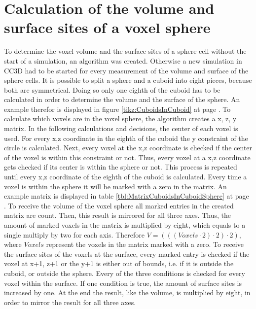 \section{Calculation of the volume and surface sites of a voxel sphere}\label{sec:CreatedAlgorithm}
To determine the voxel volume and the surface sites of a sphere cell without the start of a simulation, an algorithm was created. Otherwise a new simulation in \ac{CC3D} had to be started for every measurement of the volume and surface of the sphere cells. \newline
It is possible to split a sphere and a cuboid into eight pieces, because both are symmetrical. Doing so only one eighth of the cuboid has to be calculated in order to determine the volume and the surface of the sphere. An example therefor is displayed in figure \ref{tikz:CuboidsInCuboid} at page \pageref{tikz:CuboidsInCuboid}. \newline
To calculate which voxels are in the voxel sphere, the algorithm creates a x, z, y matrix. In the following calculations and decisions, the center of each voxel is used. For every x,z coordinate in the eighth of the cuboid the y constraint of the circle is calculated. Next, every voxel at the x,z coordinate is checked if the center of the voxel is within this constraint or not. Thus, every voxel at a x,z coordinate gets checked if its center is within the sphere or not. This process is repeated until every x,z coordinate of the eighth of the cuboid is calculated. Every time a voxel is within the sphere it will be marked with a zero in the matrix. An example matrix is displayed in table \ref{tbl:MatrixCuboidsInCuboidSphere} at page \pageref{tbl:MatrixCuboidsInCuboidSphere}. \newline
To receive the volume of the voxel sphere all marked entries in the created matrix are count. Then, this result is mirrored for all three axes. Thus, the amount of marked voxels in the matrix is multiplied by eight, which equals to a single multiply by two for each axis. Therefore $V=(((Voxels \cdot 2) \cdot 2) \cdot 2)$, where $Voxels$ represent the voxels in the matrix marked with a zero.
To receive the surface sites of the voxels at the surface, every marked entry is checked if the voxel at x+1, z+1 or the y+1 is either out of bounds, i.e. if it is outside the cuboid, or outside the sphere. Every of the three conditions is checked for every voxel within the surface. If one condition is true, the amount of surface sites is increased by one. At the end the result, like the volume, is multiplied by eight, in order to mirror the result for all three axes.




